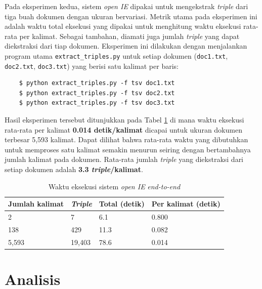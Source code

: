 Pada eksperimen kedua, sistem \textit{open IE} dipakai untuk mengekstrak \textit{triple} dari tiga buah dokumen dengan ukuran bervariasi. Metrik utama pada eksperimen ini adalah waktu total eksekusi yang dipakai untuk menghitung waktu eksekusi rata-rata per kalimat. Sebagai tambahan, diamati juga jumlah \textit{triple} yang dapat diekstraksi dari tiap dokumen. Eksperimen ini dilakukan dengan menjalankan program utama \verb|extract_triples.py| untuk setiap dokumen (\verb|doc1.txt|, \verb|doc2.txt|, \verb|doc3.txt|) yang berisi satu kalimat per baris:

\begin{verbatim}
	$ python extract_triples.py -f tsv doc1.txt
	$ python extract_triples.py -f tsv doc2.txt
	$ python extract_triples.py -f tsv doc3.txt
\end{verbatim}

Hasil eksperimen tersebut ditunjukkan pada Tabel \ref{tab:system_extraction_time} di mana waktu eksekusi rata-rata per kalimat \textbf{0.014 detik/kalimat} dicapai untuk ukuran dokumen terbesar 5,593 kalimat. Dapat dilihat bahwa rata-rata waktu yang dibutuhkan untuk memproses satu kalimat semakin menurun seiring dengan bertambahnya jumlah kalimat pada dokumen. Rata-rata jumlah \textit{triple} yang diekstraksi dari setiap dokumen adalah \textbf{3.3 \textit{triple}/kalimat}.

\begin{table}
	\caption{Waktu eksekusi sistem \textit{open IE} \textit{end-to-end}}
	\label{tab:system_extraction_time}
	\centering
	\begin{tabular}{p{4cm} p{2.5cm} p{2.5cm} p{2.5cm}}
		\hline
		\textbf{Jumlah kalimat} & \textbf{\textit{Triple}} & \textbf{Total (detik)} & \textbf{Per kalimat (detik)} \\
		\hline
		2 & 7 & 6.1 & 0.800 \\
		138 & 429 & 11.3 & 0.082 \\
		5,593 & 19,403 & 78.6 & 0.014 \\
		\hline
	\end{tabular}
\end{table}

\section{Analisis}

